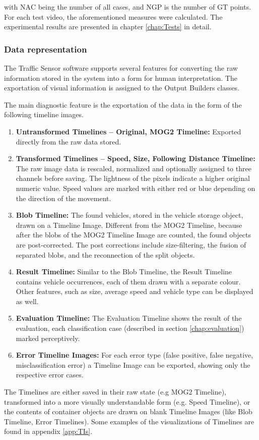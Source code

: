 with $\text{NAC}$ being the number of all cases, and $\text{NGP}$ is the number of GT points.
For each test video, the aforementioned measures were calculated.
The experimental results are presented in chapter \ref{chap:Tests} in detail.
\subsubsection{Data representation}\label{sec:data_representation}
The Traffic Sensor software supports several features for converting the raw information stored in the system into a form for human interpretation.
The exportation of visual information is assigned to the Output Builders classes.

The main diagnostic feature is the exportation of the data in the form of the following timeline images.
\begin{enumerate}
	\item \textbf{Untransformed Timelines -- Original, MOG2 Timeline: } Exported directly from the raw data stored.
	\item \textbf{Transformed Timelines -- Speed, Size, Following Distance Timeline: } The raw image data is rescaled, normalized and optionally assigned to three channels before saving. The lightness of the pixels indicate a higher original numeric value. Speed values are marked with either red or blue depending on the direction of the movement. 
	\item \textbf{Blob Timeline: } The found vehicles, stored in the vehicle storage object, drawn on a Timeline Image. Different from the MOG2 Timeline, because after the blobs of the MOG2 Timeline Image are counted, the found objects are post-corrected. The post corrections include size-filtering, the fusion of separated blobs, and the reconnection of the split objects.
	\item \textbf{Result Timeline: } Similar to the Blob Timeline, the Result Timeline contains vehicle occurrences, each of them drawn with a separate colour. Other features, such as size, average speed and vehicle type can be displayed as well.
	\item \textbf{Evaluation Timeline: } The Evaluation Timeline shows the result of the evaluation, each classification case (described in section \ref{chap:evaluation}) marked perceptively.
	\item \textbf{Error Timeline Images: } For each error type (false positive, false negative, misclassification error) a Timeline Image can be exported, showing only the respective error cases.
\end{enumerate} 
The Timelines are either saved in their raw state (e.g MOG2 Timeline), transformed into a more visually understandable form (e.g. Speed Timeline), or the contents of container objects are drawn on blank Timeline Images (like Blob Timeline, Error Timelines).
Some examples of the visualizations of Timelines are found in appendix \ref{app:TIs}.

